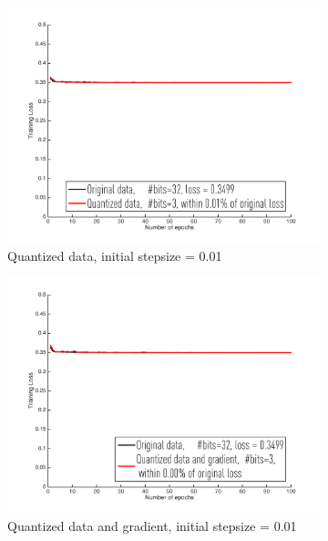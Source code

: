 \documentclass{article}
\begin{document}
\begin{figure}[h]
\centering
    \begin{subfigure}[h]{.3\columnwidth}
    \includegraphics[width=\columnwidth]{lssvm/cov-type/d001}
    \caption{Quantized data, initial stepsize = 0.01}
    \end{subfigure}
    \begin{subfigure}[h]{.3\columnwidth}
    \includegraphics[width=\columnwidth]{lssvm/cov-type/dg001}
    \caption{Quantized data and gradient, initial stepsize = 0.01}
    \end{subfigure}
    \begin{subfigure}[h]{.3\columnwidth}

\end{subfigure}
\end{figure}
\end{document}
